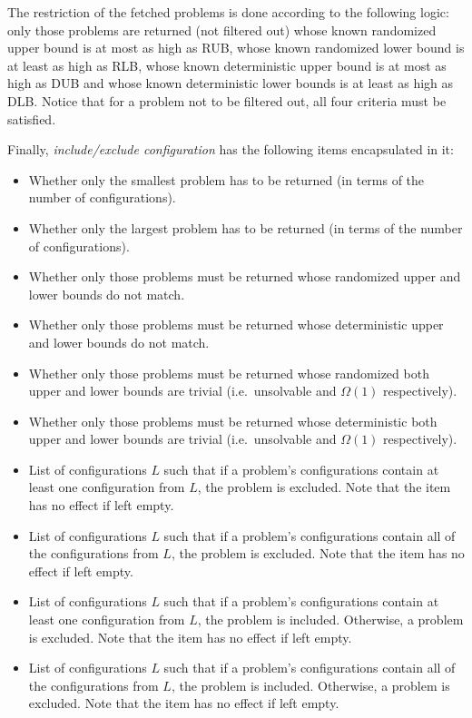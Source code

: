 The restriction of the fetched problems is done according to the
following logic: only those problems are returned (not filtered out)
whose known randomized upper bound is at most as high as RUB, whose
known randomized lower bound is at least as high as RLB, whose
known deterministic upper bound is at most as high as DUB and whose
known deterministic lower bounds is at least as high as DLB. Notice that
for a problem not to be filtered out, all four criteria must be
satisfied.

Finally, \emph{include/exclude configuration} has the following
items encapsulated in it:

\begin{itemize}
  \item Whether only the smallest problem has to be returned (in terms of the number of configurations).
  \item Whether only the largest problem has to be returned (in terms of the number of configurations).
  \item Whether only those problems must be returned whose randomized upper
  and lower bounds do not match.
  \item Whether only those problems must be returned whose deterministic upper
  and lower bounds do not match.
  \item Whether only those problems must be returned whose randomized both
  upper and lower bounds are trivial (i.e.\ unsolvable and $\Omega(1)$
  respectively).
  \item Whether only those problems must be returned whose deterministic both
  upper and lower bounds are trivial (i.e.\ unsolvable and $\Omega(1)$
  respectively).
  \item List of configurations $L$ such that if a problem's configurations contain at least one configuration from $L$, the problem is excluded. Note that
  the item has no effect if left empty.
  \item List of configurations $L$ such that if a problem's configurations contain all of the configurations from $L$, the problem is excluded. Note that
  the item has no effect if left empty.
  \item List of configurations $L$ such that if a problem's configurations contain at least one configuration from $L$, the problem is included.
  Otherwise, a problem is excluded.
  Note that
  the item has no effect if left empty.
  \item List of configurations $L$ such that if a problem's configurations contain all of the configurations from $L$, the problem is included.
  Otherwise, a problem is excluded.
  Note that
  the item has no effect if left empty.
\end{itemize}


